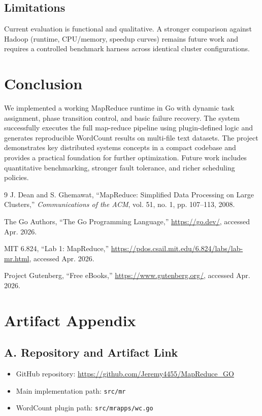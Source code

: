 \documentclass[12pt]{article}
\begin{document}
\subsection{Limitations}
Current evaluation is functional and qualitative. A stronger comparison against Hadoop (runtime, CPU/memory, speedup curves) remains future work and requires a controlled benchmark harness across identical cluster configurations.

\section{Conclusion}
We implemented a working MapReduce runtime in Go with dynamic task assignment, phase transition control, and basic failure recovery. The system successfully executes the full map-reduce pipeline using plugin-defined logic and generates reproducible WordCount results on multi-file text datasets. The project demonstrates key distributed systems concepts in a compact codebase and provides a practical foundation for further optimization. Future work includes quantitative benchmarking, stronger fault tolerance, and richer scheduling policies.

\begin{thebibliography}{9}
J. Dean and S. Ghemawat, ``MapReduce: Simplified Data Processing on Large Clusters,''
\emph{Communications of the ACM}, vol. 51, no. 1, pp. 107--113, 2008.

The Go Authors, ``The Go Programming Language,'' \url{https://go.dev/}, accessed Apr. 2026.

MIT 6.824, ``Lab 1: MapReduce,'' \url{https://pdos.csail.mit.edu/6.824/labs/lab-mr.html}, accessed Apr. 2026.

Project Gutenberg, ``Free eBooks,'' \url{https://www.gutenberg.org/}, accessed Apr. 2026.
\end{thebibliography}

\appendix
\section*{Artifact Appendix}

\subsection*{A. Repository and Artifact Link}
\begin{itemize}[leftmargin=1.5em]
  \item GitHub repository: \url{https://github.com/Jeremy4455/MapReduce_GO}
  \item Main implementation path: \texttt{src/mr}
  \item WordCount plugin path: \texttt{src/mrapps/wc.go}
\end{itemize}
\end{document}
